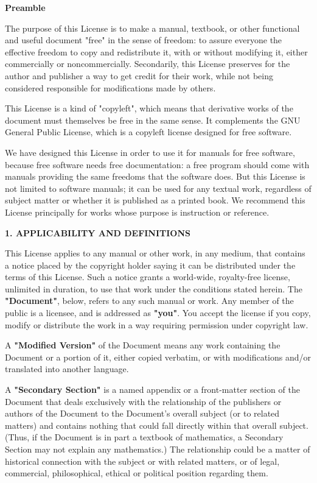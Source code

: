 \documentclass[11pt]{book}
\begin{document}
\begin{center}
{\bf\large Preamble}
\end{center}

The purpose of this License is to make a manual, textbook, or other
functional and useful document "free" in the sense of freedom: to
assure everyone the effective freedom to copy and redistribute it,
with or without modifying it, either commercially or noncommercially.
Secondarily, this License preserves for the author and publisher a way
to get credit for their work, while not being considered responsible
for modifications made by others.

This License is a kind of "copyleft", which means that derivative
works of the document must themselves be free in the same sense.  It
complements the GNU General Public License, which is a copyleft
license designed for free software.

We have designed this License in order to use it for manuals for free
software, because free software needs free documentation: a free
program should come with manuals providing the same freedoms that the
software does.  But this License is not limited to software manuals;
it can be used for any textual work, regardless of subject matter or
whether it is published as a printed book.  We recommend this License
principally for works whose purpose is instruction or reference.


\begin{center}
{\Large\bf 1. APPLICABILITY AND DEFINITIONS}
\end{center}

This License applies to any manual or other work, in any medium, that
contains a notice placed by the copyright holder saying it can be
distributed under the terms of this License.  Such a notice grants a
world-wide, royalty-free license, unlimited in duration, to use that
work under the conditions stated herein.  The \textbf{"Document"}, below,
refers to any such manual or work.  Any member of the public is a
licensee, and is addressed as \textbf{"you"}.  You accept the license if you
copy, modify or distribute the work in a way requiring permission
under copyright law.

A \textbf{"Modified Version"} of the Document means any work containing the
Document or a portion of it, either copied verbatim, or with
modifications and/or translated into another language.

A \textbf{"Secondary Section"} is a named appendix or a front-matter section of
the Document that deals exclusively with the relationship of the
publishers or authors of the Document to the Document's overall subject
(or to related matters) and contains nothing that could fall directly
within that overall subject.  (Thus, if the Document is in part a
textbook of mathematics, a Secondary Section may not explain any
mathematics.)  The relationship could be a matter of historical
connection with the subject or with related matters, or of legal,
commercial, philosophical, ethical or political position regarding
them.
\end{document}
